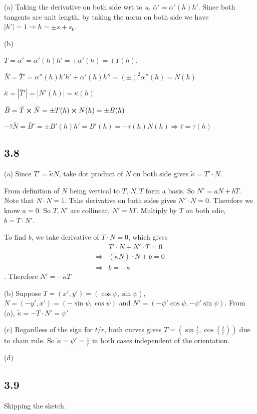 \documentclass[12pt]{article}
\begin{document}
(a) Taking the derivative on both side wrt to $u$, $\bar{\alpha}' = \alpha'(h)h'$. Since both tangents are unit length, by taking the norm on both side we have $|h'| = 1 \Rightarrow h = \pm s + s_0$.

(b)

 $\bar{T} = \bar{\alpha}' = \alpha'(h)h' = \pm \alpha'(h)  = \pm T(h)$.

$\bar{N} = \bar{T}' = \alpha''(h)h' h' + \alpha'(h)h'' = (\pm)^2 \alpha''(h) = N(h)$

$\bar{\kappa} = |\bar{T}'| = |N'(h)| = \kappa(h)$

$\bar{B} = \bar{T} \cross \bar {N} = \pm T(h) \cross N(h) = \pm B(h)$

$ - \bar{\tau} \bar{N} = \bar{B}' = \pm B'(h) h' = B'(h) = -\tau(h)N(h) \Rightarrow \bar{\tau} = \tau(h) $

\subsection*{3.8}
(a) Since $T'=\tilde{\kappa} N$, take dot product of $N$ on both side gives $\tilde{\kappa} = T' \cdot N$.

 From definition of $N$ being vertical to $T$, $N, T$ form a basis. So $N' = aN + bT$. Note that $N \cdot N = 1$. Take derivative on both sides gives $N'\cdot N = 0$. Therefore we know $a = 0$. So $T, N'$ are collinear, $N' = b T$.  Multiply by $T$ on both sdie, $b = T \cdot N'$.

To find $b$, we take derivative of $T\cdot N = 0$, which gives $$ 
\begin{aligned}
	&T' \cdot N + N' \cdot T = 0 \\ 
	\Rightarrow &(\tilde{\kappa}N) \cdot N + b = 0 \\
	\Rightarrow &b= - \tilde{\kappa}
\end{aligned}
$$. 
Therefore $N' = -\tilde{\kappa} T$

(b) Suppose $T = (x', y')= (\cos \psi, \sin \psi)$,  $N=(-y', x') = (-\sin \psi, \cos \psi)$ and $N'=(-\psi' \cos \psi, -\psi' \sin \psi )$. From (a), $\tilde{\kappa} = -T\cdot N' = \psi'$

(c) Regardless of the sign for $t/r$, both curves gives $T = (\sin\frac{t}{r}, \cos(\frac{t}{r}))$ due to chain rule. So $\tilde{\kappa} = \psi' = \frac{1}{r}$ in both cases independent of the orientation.

(d) 

\subsection*{3.9}
Skipping the sketch.
\end{document}
